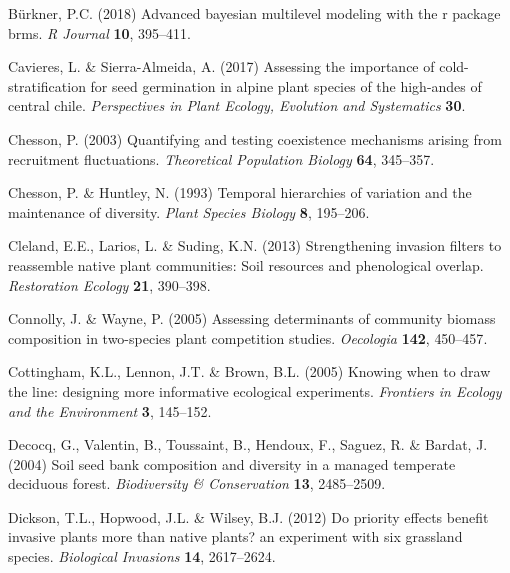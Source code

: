 \documentclass{article}[11pt]
\begin{document}
\begin{thebibliography}{62}
B{\"u}rkner, P.C. (2018) Advanced bayesian multilevel modeling with the r
  package brms. \emph{R Journal} \textbf{10}, 395--411.

Cavieres, L. \& Sierra-Almeida, A. (2017) Assessing the importance of
  cold-stratification for seed germination in alpine plant species of the
  high-andes of central chile. \emph{Perspectives in Plant Ecology, Evolution
  and Systematics} \textbf{30}.

Chesson, P. (2003) Quantifying and testing coexistence mechanisms arising from
  recruitment fluctuations. \emph{Theoretical Population Biology} \textbf{64},
  345--357.

Chesson, P. \& Huntley, N. (1993) Temporal hierarchies of variation and the
  maintenance of diversity. \emph{Plant Species Biology} \textbf{8}, 195--206.

Cleland, E.E., Larios, L. \& Suding, K.N. (2013) Strengthening invasion filters
  to reassemble native plant communities: Soil resources and phenological
  overlap. \emph{Restoration Ecology} \textbf{21}, 390--398.

Connolly, J. \& Wayne, P. ({2005}) {Assessing determinants of community biomass
  composition in two-species plant competition studies}. \emph{Oecologia}
  \textbf{{142}}, {450--457}.

Cottingham, K.L., Lennon, J.T. \& Brown, B.L. (2005) Knowing when to draw the
  line: designing more informative ecological experiments. \emph{Frontiers in
  Ecology and the Environment} \textbf{3}, 145--152.


Decocq, G., Valentin, B., Toussaint, B., Hendoux, F., Saguez, R. \& Bardat, J.
  (2004) Soil seed bank composition and diversity in a managed temperate
  deciduous forest. \emph{Biodiversity \& Conservation} \textbf{13},
  2485--2509.

Dickson, T.L., Hopwood, J.L. \& Wilsey, B.J. (2012) Do priority effects benefit
  invasive plants more than native plants? an experiment with six grassland
  species. \emph{Biological Invasions} \textbf{14}, 2617--2624.


\end{thebibliography}
\end{document}
